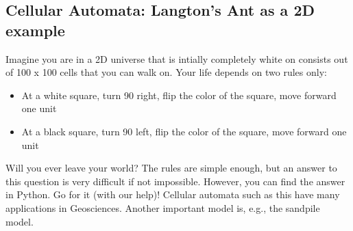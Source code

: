 \subsection{Cellular Automata: Langton's Ant as a 2D example}
Imagine you are in a 2D universe that is intially completely white on consists out of 100 x 100 cells that you can walk on. Your life depends on two rules only:

\begin{itemize}
    \item At a white square, turn 90 right, flip the color of the square, move forward one unit
    \item At a black square, turn 90 left, flip the color of the square, move forward one unit
\end{itemize}

Will you ever leave your world? The rules are simple enough, but an answer to this question is very difficult if not impossible. However, you can find the answer in Python. Go for it (with our help)! Cellular automata such as this have many applications in Geosciences. Another important model is, e.g., the sandpile model.
